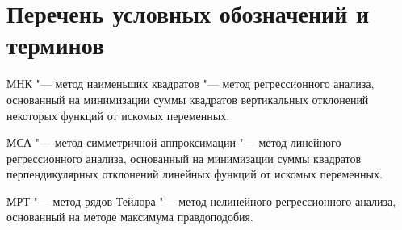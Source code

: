 \chapter*{Перечень условных обозначений и терминов}

МНК
"--- метод наименьших квадратов
"--- метод регрессионного анализа,
основанный на минимизации суммы квадратов вертикальных
отклонений некоторых функций от искомых переменных.

МСА
"--- метод симметричной аппроксимации
"--- метод линейного регрессионного анализа,
основанный на минимизации суммы квадратов перпендикулярных
отклонений линейных функций от искомых переменных.

МРТ
"--- метод рядов Тейлора
"--- метод нелинейного регрессионного анализа,
основанный на методе максимума правдоподобия.